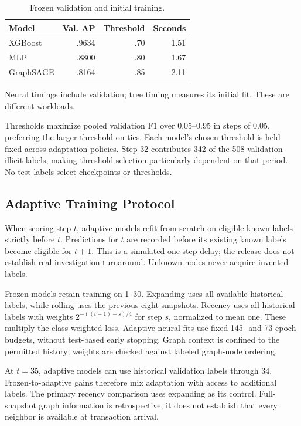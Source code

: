 \documentclass[10pt,twocolumn,letterpaper]{article}
\begin{document}
\begin{table}[t]\caption{Frozen validation and initial training.}\centering\small
\begin{tabular}{lrrr}\toprule
Model & Val. AP & Threshold & Seconds\\\midrule
XGBoost & .9634 & .70 & 1.51\\
MLP & .8800 & .80 & 1.67\\
GraphSAGE & .8164 & .85 & 2.11\\\bottomrule
\end{tabular}
\par\vspace{3pt}\footnotesize Neural timings include validation; tree timing measures its initial fit. These are different workloads.
\end{table}

Thresholds maximize pooled validation F1 over 0.05--0.95 in steps of 0.05, preferring the larger threshold on ties. Each model's chosen threshold is held fixed across adaptation policies. Step 32 contributes 342 of the 508 validation illicit labels, making threshold selection particularly dependent on that period. No test labels select checkpoints or thresholds.

\subsection{Adaptive Training Protocol}
When scoring step $t$, adaptive models refit from scratch on eligible known labels strictly before $t$. Predictions for $t$ are recorded before its existing known labels become eligible for $t+1$. This is a simulated one-step delay; the release does not establish real investigation turnaround. Unknown nodes never acquire invented labels.

Frozen models retain training on 1--30. Expanding uses all available historical labels, while rolling uses the previous eight snapshots. Recency uses all historical labels with weights $2^{-((t-1)-s)/4}$ for step $s$, normalized to mean one. These multiply the class-weighted loss. Adaptive neural fits use fixed 145- and 73-epoch budgets, without test-based early stopping. Graph context is confined to the permitted history; weights are checked against labeled graph-node ordering.

At $t=35$, adaptive models can use historical validation labels through 34. Frozen-to-adaptive gains therefore mix adaptation with access to additional labels. The primary recency comparison uses expanding as its control. Full-snapshot graph information is retrospective; it does not establish that every neighbor is available at transaction arrival.
\end{document}
